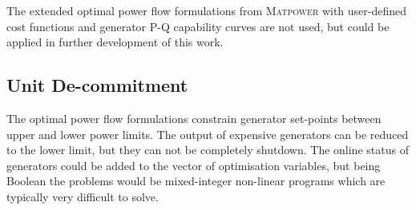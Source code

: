 The extended optimal power flow formulations from \textsc{Matpower} with
user-defined cost functions and generator P-Q capability curves are not used,
but could be applied in further development of this work.


\subsection{Unit De-commitment}
\label{sec:decommit}
The optimal power flow formulations constrain generator set-points between
upper and lower power limits.  The output of expensive generators can be
reduced to the lower limit, but they can not be completely shutdown.  The
online status of generators could be added to the vector of
optimisation variables, but being Boolean the problems would be
mixed-integer non-linear programs which are typically very difficult to
solve.

